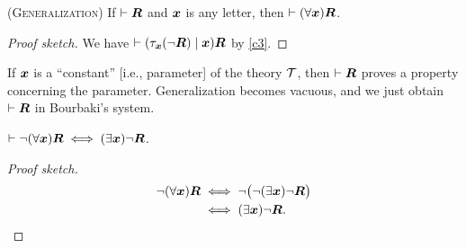 \begin{dc}\label{c27} \textup{(\textsc{Generalization})}
If $\vdash\boldsymbol{R}$ and $\boldsymbol{x}$ is any letter, then
$\vdash(\forall\boldsymbol{x})\boldsymbol{R}$.
\end{dc}

\begin{proof}[Proof sketch]
We have $\vdash(\tau_{\boldsymbol{x}}(\neg\boldsymbol{R})\mid\boldsymbol{x})\boldsymbol{R}$
by \ref{c3}.
\end{proof}

\begin{remark*}
If $\boldsymbol{x}$ is a ``constant'' [i.e., parameter] of the theory
$\mathcal{T}$, then $\vdash\boldsymbol{R}$ proves a property concerning
the parameter. Generalization becomes vacuous, and we just obtain
$\vdash\boldsymbol{R}$ in Bourbaki's system.
\end{remark*}

\begin{dc}\label{c28}
$\vdash\neg(\forall\boldsymbol{x})\boldsymbol{R}\iff(\exists\boldsymbol{x})\neg\boldsymbol{R}$.
\end{dc}

\begin{proof}[Proof sketch]
\begin{align*}
\neg(\forall\boldsymbol{x})\boldsymbol{R} &\iff\neg\bigl(\neg(\exists\boldsymbol{x})\neg\boldsymbol{R}\bigr)\\
&\iff(\exists\boldsymbol{x})\neg\boldsymbol{R}.\qedhere
\end{align*}
\end{proof}
